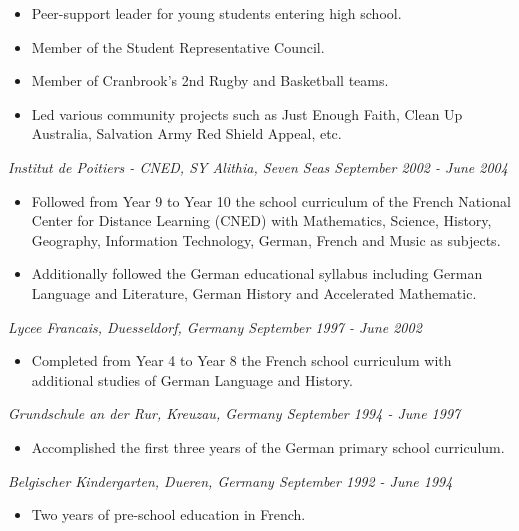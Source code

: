 \documentclass[margin]{res}
\begin{document}
\begin{resume}
\begin{itemize}
  \item Peer-support leader for young students entering high school.
  \item Member of the Student Representative Council.
  \item Member of Cranbrook’s 2nd Rugby and Basketball teams.
  \item Led various community projects such as Just Enough Faith, Clean Up Australia, Salvation Army Red Shield Appeal, etc.
  \end{itemize}
  {\it Institut de Poitiers - CNED, SY Alithia, Seven Seas \hfill September 2002 - June 2004}
  \begin{itemize} \itemsep -0.5pt 
  \item Followed from Year 9 to Year 10 the school curriculum of the French National Center for Distance Learning (CNED) with Mathematics, Science, History, Geography, Information Technology, German, French and Music as subjects.
  \item Additionally followed the German educational syllabus including German Language and Literature, German History and Accelerated Mathematic.
  \end{itemize}
  {\it Lycee Francais, Duesseldorf, Germany \hfill September 1997 - June 2002}
  \begin{itemize} \itemsep -0.5pt 
  \item Completed from Year 4 to Year 8 the French school curriculum with additional studies of German Language and History.
  \end{itemize}
  {\it Grundschule an der Rur, Kreuzau, Germany \hfill September 1994 - June 1997}
  \begin{itemize} \itemsep -0.5pt 
  \item Accomplished the first three years of the German primary school curriculum.
  \end{itemize}
  {\it Belgischer Kindergarten, Dueren, Germany \hfill September 1992 - June 1994}
  \begin{itemize} \itemsep -0.5pt 
  \item Two years of pre-school education in French.
  \end{itemize}

\newpage


\end{resume}
\end{document}
